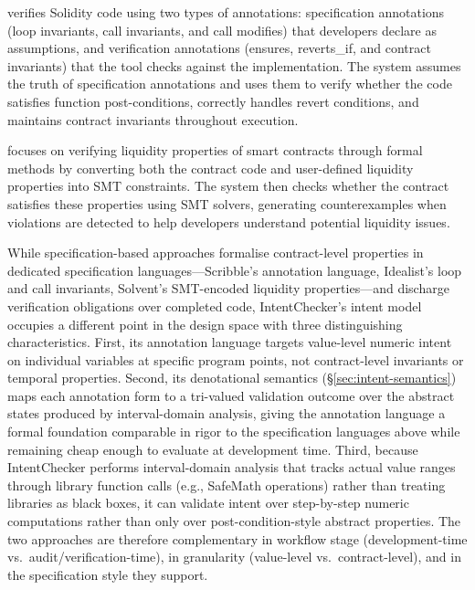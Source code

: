 \documentclass[pdflatex,sn-basic]{sn-jnl}%
\theoremstyle{thmstyleone}%
\theoremstyle{thmstyletwo}%
\theoremstyle{thmstylethree}%
\begin{document}
\citep{idealist} verifies Solidity code using two types of annotations: specification annotations (loop invariants, call invariants, and call modifies) that developers declare as assumptions,
and verification annotations (ensures, reverts\_if, and contract invariants) that the tool checks against the implementation.
The system assumes the truth of specification annotations and uses them to verify whether the code satisfies function post-conditions,
correctly handles revert conditions, and maintains contract invariants throughout execution.

\citep{solvent} focuses on verifying liquidity properties of smart contracts through formal methods
by converting both the contract code and user-defined liquidity properties into SMT constraints.
The system then checks whether the contract satisfies these properties using SMT solvers,
generating counterexamples when violations are detected to help developers understand potential liquidity issues.


While specification-based approaches formalise contract-level properties in dedicated specification languages---Scribble's annotation language, Idealist's loop and call invariants, Solvent's SMT-encoded liquidity properties---and discharge verification obligations over completed code, IntentChecker's intent model occupies a different point in the design space with three distinguishing characteristics.
First, its annotation language targets value-level numeric intent on individual variables at specific program points, not contract-level invariants or temporal properties.
Second, its denotational semantics (§\ref{sec:intent-semantics}) maps each annotation form to a tri-valued validation outcome over the abstract states produced by interval-domain analysis, giving the annotation language a formal foundation comparable in rigor to the specification languages above while remaining cheap enough to evaluate at development time.
Third, because IntentChecker performs interval-domain analysis that tracks actual value ranges through library function calls (e.g., SafeMath operations) rather than treating libraries as black boxes, it can validate intent over step-by-step numeric computations rather than only over post-condition-style abstract properties.
The two approaches are therefore complementary in workflow stage (development-time vs.\ audit/verification-time), in granularity (value-level vs.\ contract-level), and in the specification style they support.
\end{document}

